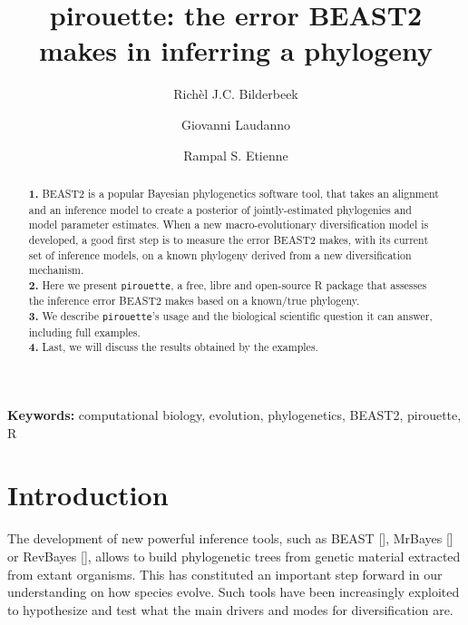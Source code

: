 \documentclass{article}
\title{pirouette: the error BEAST2 makes in inferring a phylogeny}
\author[1]{Rich\`el J.C. Bilderbeek}
\author[1]{Giovanni Laudanno}
\author[1]{Rampal S. Etienne}
\affil[1]{Groningen Institute for Evolutionary Life Sciences, University of Groningen, Groningen, The Netherlands}
\begin{document}
\maketitle

\begin{abstract}

  \textbf{1. }
    BEAST2 is a popular Bayesian phylogenetics software tool,
    that takes an alignment and an inference model to create a
    posterior of jointly-estimated phylogenies and model parameter estimates.
    When a new macro-evolutionary diversification model is developed,
    a good first step is to measure the error BEAST2 makes, with its current set of inference models, on a known
    phylogeny derived from a new diversification mechanism. \\
  \textbf{2. }
    Here we present \verb;pirouette;, a free, libre and open-source R package that assesses the inference error BEAST2 makes based on a known/true 
    phylogeny. \\
  \textbf{3. }
    We describe \verb;pirouette;'s usage and the biological scientific
    question it can answer, including full examples. \\
  \textbf{4. }
    Last, we will discuss the results obtained by the examples. \\
\end{abstract}

{\bf Keywords:} computational biology, evolution, phylogenetics, BEAST2, pirouette, R

\section{Introduction}

The development of new powerful inference tools, 
such as BEAST [\cite{drummond2007beast}], MrBayes [\cite{huelsenbeck2001mrbayes}]
or RevBayes [\cite{hohna2016revbayes}], 
allows to build phylogenetic trees 
from genetic material extracted from extant organisms.
This has constituted an important step forward 
in our understanding on how species evolve.
Such tools have been increasingly exploited to hypothesize 
and test what the main drivers and modes for diversification are.
\end{document}
